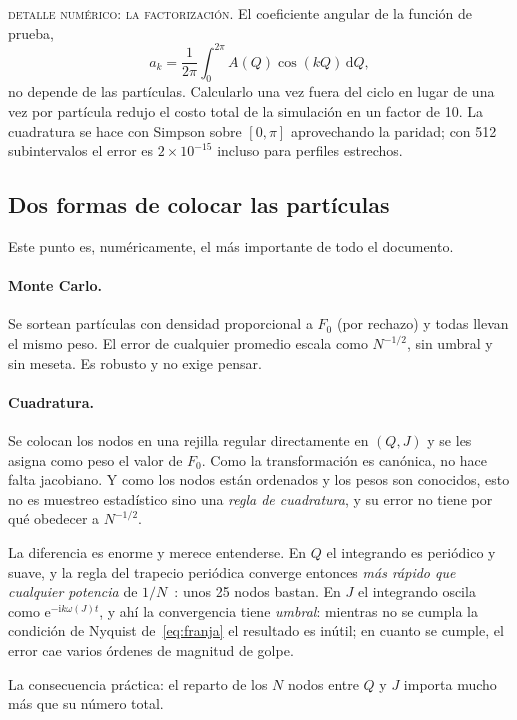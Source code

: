 \documentclass[11pt,a4paper]{article}
\newcommand{\dd}{\mathrm{d}}
\newcommand{\ee}{\mathrm{e}}
\newcommand{\ii}{\mathrm{i}}
\newcommand{\Jr}{J}
\newcommand{\Qr}{Q}
\theoremstyle{definition}
\begin{document}
\begin{aviso}
\textsc{detalle numérico: la factorización.} El coeficiente angular de la función
de prueba,
\[
  a_k = \frac{1}{2\pi}\int_0^{2\pi} A(\Qr)\cos(k\Qr)\,\dd \Qr,
\]
no depende de las partículas. Calcularlo una vez fuera del ciclo en lugar de una
vez por partícula redujo el costo total de la simulación en un factor de 10. La
cuadratura se hace con Simpson sobre $[0,\pi]$ aprovechando la paridad; con 512
subintervalos el error es $2\times10^{-15}$ incluso para perfiles estrechos.
\end{aviso}

\subsection{Dos formas de colocar las partículas}
\label{sec:muestreo}

Este punto es, numéricamente, el más importante de todo el documento.

\paragraph{Monte Carlo.} Se sortean partículas con densidad proporcional a $F_0$
(por rechazo) y todas llevan el mismo peso. El error de cualquier promedio escala
como $N^{-1/2}$, sin umbral y sin meseta. Es robusto y no exige pensar.

\paragraph{Cuadratura.} Se colocan los nodos en una rejilla regular directamente en
$(\Qr,\Jr)$ y se les asigna como peso el valor de $F_0$. Como la transformación es
canónica, no hace falta jacobiano. Y como los nodos están ordenados y los pesos son
conocidos, esto no es muestreo estadístico sino una \emph{regla de cuadratura}, y su
error no tiene por qué obedecer a $N^{-1/2}$.

\begin{idea}
La diferencia es enorme y merece entenderse. En $\Qr$ el integrando es periódico y
suave, y la regla del trapecio periódica converge entonces \emph{más rápido que
cualquier potencia} de $1/N$~\cite{trefethen2014}: unos 25 nodos bastan. En $\Jr$
el integrando oscila como $\ee^{-\ii k\omega(\Jr)t}$, y ahí la convergencia tiene
\emph{umbral}: mientras no se cumpla la condición de Nyquist de~\eqref{eq:franja}
el resultado es inútil; en cuanto se cumple, el error cae varios órdenes de
magnitud de golpe.

\medskip
La consecuencia práctica: el reparto de los $N$ nodos entre $\Qr$ y $\Jr$ importa
mucho más que su número total.
\end{idea}
\end{document}
